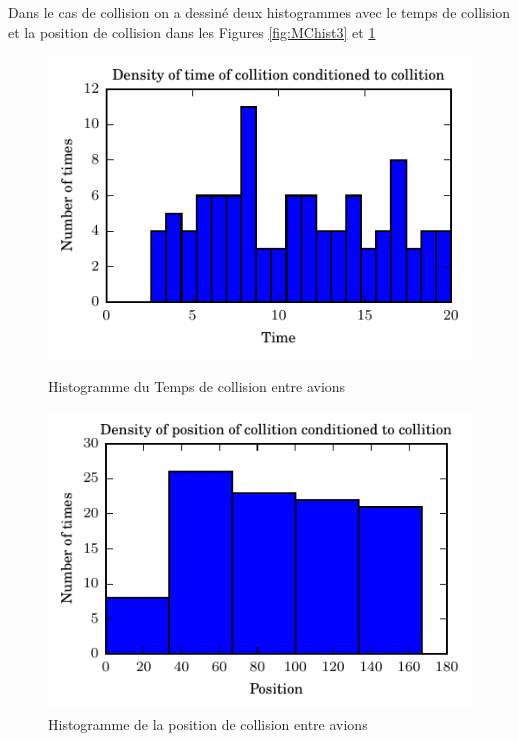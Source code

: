 \documentclass[a4paper, 12pt,twoside]{article}
\numberwithin{equation}{subsection}
\newlength{\mylength}
\begin{document}
	Dans le cas de collision on a dessiné deux histogrammes avec le temps de collision et la position de collision dans les Figures \ref{fig:MChist3} et \ref{fig:MChist4}
	
	\begin{figure}[htbp]
		\centering
		\begin{minipage}[b]{\mylength}
			\includegraphics[width=\textwidth]{Images/Script_5_6}
			\caption{Histogramme du Temps de collision entre avions}
			\label{fig:MChist3}
		\end{minipage}
		\hfill
		\begin{minipage}[b]{\mylength}
			\includegraphics[width=\textwidth]{Images/Script_5_7}
			\caption{Histogramme de la position de collision entre avions}
			\label{fig:MChist4}
		\end{minipage}
	\end{figure}
	
\end{document}
